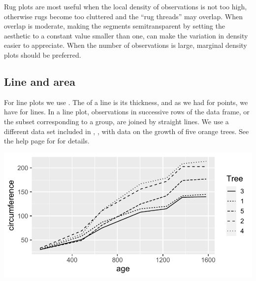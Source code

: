 \documentclass[krantz2]{krantz}\usepackage{knitr}
\begin{document}
\begin{warningbox}
  Rug plots are most useful when the local density of observations is not too high, otherwise rugs become too cluttered and the ``rug threads'' may overlap. When overlap is moderate, making the segments semitransparent by setting the  aesthetic to a constant value smaller than one, can make the variation in density easier to appreciate. When the number of observations is large, marginal density plots should be preferred.
\end{warningbox}

\subsection{Line and area}\label{sec:plot:line}

For line plots we use . The  of a line is its thickness, and as we had  for points, we have  for lines. In a line plot, observations in successive rows of the data frame, or the subset corresponding to a group, are joined by straight lines. We use a different data set included in \Rlang, , with data on the growth of five orange trees. See the help page for  for details.

\label{plot:fig:lines}
\begin{knitrout}\footnotesize
{}\color{fgcolor}\begin{kframe}
\begin{alltt}
\hlstd{(} 
       \hlstd{(}      \hlopt{+}
  \hlstd{()}
\end{alltt}
\end{kframe}

{\centering \includegraphics[width=.7\textwidth]{figure/pos-line-plot-01-1}

}



\end{knitrout}
\end{document}
